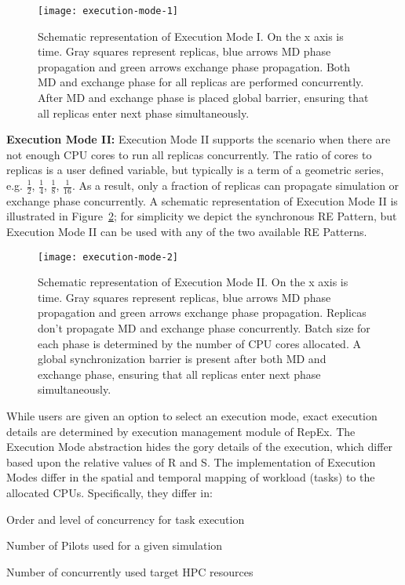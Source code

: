 \documentclass{sig-alternate-05-2015}
\begin{document}
\begin{figure}
  \centering
  \texttt{[image: execution-mode-1]}
  \caption{\small{Schematic representation of Execution Mode I. On the x axis is time. Gray squares represent replicas, blue arrows MD phase propagation and green arrows exchange phase propagation. Both MD and exchange phase for all replicas are performed concurrently. After MD and exchange phase is placed global barrier, ensuring that all replicas enter next phase simultaneously.}}
  \label{fig:exec.mode.1}
\end{figure} 

{\bf Execution Mode II:} Execution Mode II supports the scenario when there are not enough CPU cores to run all replicas concurrently. The ratio of cores to replicas is a user defined variable, but typically is a term of a geometric series, e.g. $\frac{1}{2}$, $\frac{1}{4}$, $\frac{1}{8}$, $\frac{1}{16}$. As a result, only a fraction of replicas can propagate simulation or exchange phase concurrently. A schematic representation of Execution Mode II is illustrated in Figure~\ref{fig:exec-mode-2}; for simplicity we depict the synchronous RE Pattern, but Execution Mode II can be used with any of the two available RE Patterns.

\begin{figure}
  \centering
  \texttt{[image: execution-mode-2]}
  \caption{\small{Schematic representation of Execution Mode II. On the x axis is time. Gray squares represent replicas, blue arrows MD phase propagation and green arrows exchange phase propagation. Replicas don't propagate MD and exchange phase concurrently. Batch size for each phase is determined by the number of CPU cores allocated.  A global synchronization barrier is present after both MD and exchange phase, ensuring that all replicas enter next phase simultaneously.}}
  \label{fig:exec-mode-2}
\end{figure} 

While users are given an option to select an execution mode, exact execution details are determined by execution management module of RepEx.  The Execution Mode abstraction hides the gory details of the execution, which differ based upon the relative values of R and S. The implementation of Execution Modes differ in the spatial and temporal mapping of workload (tasks) to the allocated CPUs. Specifically, they differ in: 
\begin{compactitem}
  \item Order and level of concurrency for task execution 
  \item Number of Pilots used for a given simulation
  \item Number of concurrently used target HPC resources
\end{compactitem}
 
\end{document}
